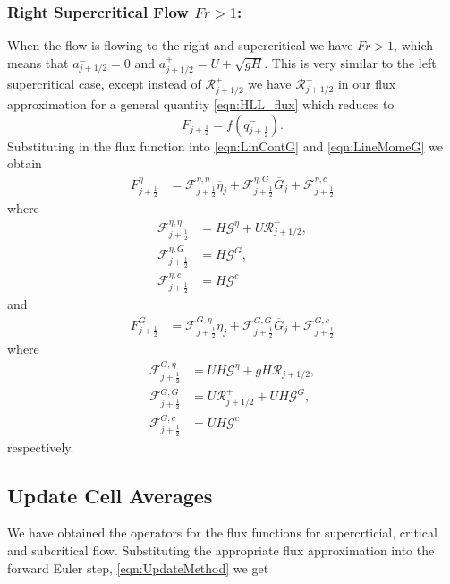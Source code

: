 \subsubsection{Right Supercritical Flow $Fr > 1$:}
When the flow is flowing to the right and supercritical we have $ Fr > 1 $, which means that $a^-_{j+ 1/2} = 0$ and $a^+_{j+ 1/2} =  U + \sqrt{g H}$. This is very similar to the left supercritical case, except instead of $\mathcal{R}^+_{j+1/2}$ we have $\mathcal{R}^-_{j+1/2}$ in our flux approximation for a general quantity \eqref{eqn:HLL_flux} which reduces to
\begin{equation*}
F_{j+\frac{1}{2}} = f\left(q^-_{j+\frac{1}{2}}\right).
\end{equation*}
Substituting in the flux function into \eqref{eqn:LinContG} and \eqref{eqn:LineMomeG} we obtain
	\begin{align*}
	F^\eta_{j+\frac{1}{2}} &= \mathcal{F}^{\eta, \eta}_{j+\frac{1}{2}} \overline{\eta}_{j} + \mathcal{F}^{\eta, G}_{j+\frac{1}{2}} \overline{G}_{j} + \mathcal{F}^{\eta, c}_{j+\frac{1}{2}}
	\end{align*}
	where
	\begin{align*}
	\mathcal{F}^{\eta, \eta}_{j+\frac{1}{2}} &=  H \mathcal{G}^{\eta} + U \mathcal{R}^-_{j+1/2},\\
	\mathcal{F}^{\eta, G}_{j+\frac{1}{2}} &=  H \mathcal{G}^G,\\
	\mathcal{F}^{\eta, c}_{j+\frac{1}{2}} &=  H\mathcal{G}^c
	\end{align*}
and
	\begin{align*}
	F^G_{j+\frac{1}{2}} &= \mathcal{F}^{G, \eta}_{j+\frac{1}{2}} \overline{\eta}_{j} + \mathcal{F}^{G, G}_{j+\frac{1}{2}} \overline{G}_{j} + \mathcal{F}^{G, c}_{j+\frac{1}{2}}
	\end{align*}
	where
	\begin{align*}
	\mathcal{F}^{G, \eta}_{j+\frac{1}{2}} &=  UH \mathcal{G}^{\eta} + gH \mathcal{R}^-_{j+1/2},\\
	\mathcal{F}^{G, G}_{j+\frac{1}{2}} &=  U\mathcal{R}^+_{j+1/2}  +  UH \mathcal{G}^G, \\
	\mathcal{F}^{G, c}_{j+\frac{1}{2}} &=  UH\mathcal{G}^c
	\end{align*}
respectively.



\subsection{Update Cell Averages}
We have obtained the operators for the flux functions for supercrticial, critical and subcritical flow. Substituting the appropriate flux approximation into the forward Euler step, \eqref{eqn:UpdateMethod} we get

